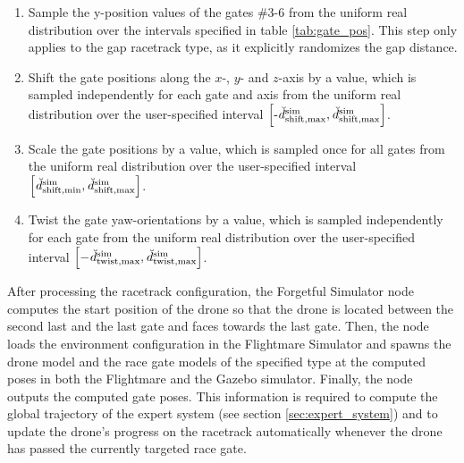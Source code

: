 \begin{enumerate}
    \item Sample the y-position values 
    of the gates \#3-6 from the uniform real distribution
    over the intervals specified in table \ref{tab:gate_pos}.
    This step only applies to the gap racetrack type,
    as it explicitly randomizes the gap distance.
    \item Shift the gate positions along the $x$-, $y$- and $z$-axis
    by a value, which is sampled
    independently for each gate and axis
    from the uniform real distribution
    over the user-specified interval 
    $\left[
        \text{-}\dist[\user]{\text{sim}}{\text{shift},\mxm}{}{},
        \dist[\user]{\text{sim}}{\text{shift},\mxm}{}{}\right]$.
    \item Scale the gate positions by a value,
    which is sampled once for all gates from the uniform real distribution
    over the user-specified interval
    $\left[
        \dist[\user]{\text{sim}}{\text{shift},\mnm}{}{}, 
        \dist[\user]{\text{sim}}{\text{shift},\mxm}{}{}\right]$.
    \item Twist the gate yaw-orientations
    by a value, which is sampled 
    independently for each gate 
    from the uniform real distribution
    over the user-specified interval
    $\left[
        -\dist[\user]{\text{sim}}{\text{twist},\mxm}{}{},
        \dist[\user]{\text{sim}}{\text{twist},\mxm}{}{}\right]$.
\end{enumerate}
After processing the racetrack configuration,
the Forgetful Simulator node computes
the start position of the drone so that
the drone is located between the second last and the last gate
and faces towards the last gate.
Then, the node loads the 
environment configuration
in the Flightmare Simulator 
and 
spawns the drone model 
and the race gate models of the specified type
at the computed poses
in both the Flightmare and the Gazebo simulator.
Finally, the node
outputs the computed gate poses.
This information is required 
to compute the global trajectory of the expert system
(see section \ref{sec:expert_system})
and to update the drone's progress on the racetrack automatically
whenever the drone has passed the currently targeted race gate.













